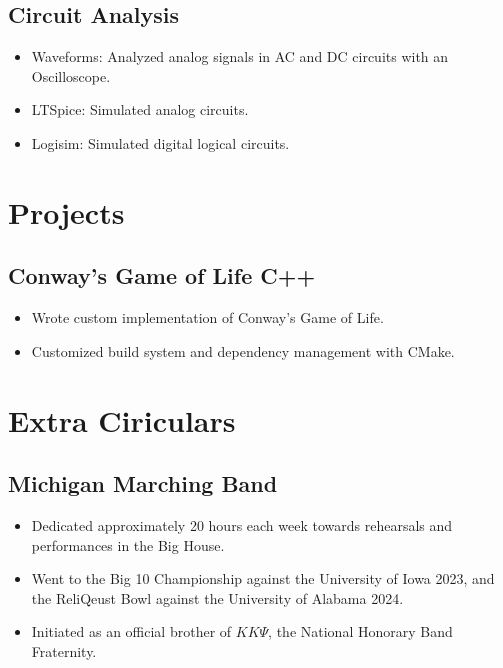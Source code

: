 \documentclass{article}
\begin{document}
\subsection*{Circuit Analysis}
\begin{itemize}
	\item Waveforms: Analyzed analog signals in AC and DC circuits with an Oscilloscope.	
	\item LTSpice: Simulated analog circuits.
	\item Logisim: Simulated digital logical circuits.
\end{itemize}

\section*{Projects}
\subsection*{Conway's Game of Life \text{\text{|}} C++}
\begin{itemize}
	\item Wrote custom implementation of Conway's Game of Life.
	\item Customized build system and dependency management with CMake.
\end{itemize}

\section*{Extra Ciriculars}
\subsection*{Michigan Marching Band}
\begin{itemize}
	\item Dedicated approximately 20 hours each week towards rehearsals and performances in the Big House.
	\item Went to the Big 10 Championship against the University of Iowa 2023,
		and the ReliQeust Bowl against the University of Alabama 2024.
	\item Initiated as an official brother of $K K\Psi$, the National Honorary Band Fraternity.
\end{itemize}
\end{document}

